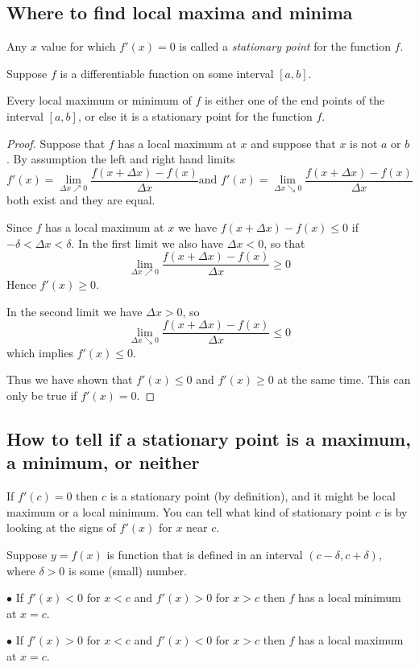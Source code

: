 \subsection{Where to find local maxima and minima}
\label{sec:where-find-maxes}
Any $x$ value for which $f'(x) = 0$ is called a \emph{stationary point} for the
function $f$.

\begin{theorem}\label{thm:zero-deriv-at-extrema}
  Suppose $f$ is a differentiable function on some interval $[a,b]$.

  Every local maximum or minimum of $f$ is either one of the end points of the
  interval $[a,b]$, or else it is a stationary point for the function $f$.
\end{theorem}

\begin{proof}
  Suppose that $f $ has a local maximum at $x$ and suppose that $x$ is not $a$
  or $b$.  By assumption the left and right hand limits
  \[
  f'(x) = \lim_{\Delta x\nearrow 0}\frac{f(x+\Delta x)-f(x)}{\Delta x} \text{
    and } f'(x) = \lim_{\Delta x\searrow 0}\frac{f(x+\Delta x)-f(x)}{\Delta x}
  \]
  both exist and they are equal.

  Since $f$ has a local maximum at $x$ we have $f(x+\Delta x)-f(x)\leq 0$ if
  $-\delta<\Delta x<\delta$.  In the first limit we also have $\Delta x<0$, so
  that
  \[
  \lim_{\Delta x\nearrow 0}\frac{f(x+\Delta x)-f(x)}{\Delta x} \geq 0
  \]
  Hence $f'(x) \geq 0$.

  In the second limit we have $\Delta x>0$, so
  \[
  \lim_{\Delta x\searrow 0}\frac{f(x+\Delta x)-f(x)}{\Delta x} \leq 0
  \]
  which implies $f'(x)\leq 0$.

  Thus we have shown that $f'(x)\leq0$ and $f'(x)\geq 0$ at the same time.  This
  can only be true if $f'(x) = 0$.
\end{proof}

\subsection{How to tell if a stationary point is a maximum, a minimum, or neither}
\label{sec:isitamaxormin}
If $f'(c)=0$ then $c$ is a stationary point (by definition), and it might be
local maximum or a local minimum.  You can tell what kind of stationary point
$c$ is by looking at the signs of $f'(x)$ for $x$ near $c$.

\begin{theorem}\label{thm:max-min-test}
  Suppose $y=f(x)$ is function that is defined in an interval
  $(c-\delta, c+\delta)$, where $\delta>0$ is some (small) number.
  \begin{trivlist}
  \item[$\bullet$] If $f'(x)<0$ for $x<c$ and $f'(x)>0$ for $x>c$ then $f$ has a
    local minimum at $x=c$.
  \item[$\bullet$] If $f'(x)>0$ for $x<c$ and $f'(x)<0$ for $x>c$ then $f$ has a
    local maximum at $x=c$.
  \end{trivlist}
\end{theorem}%
\marginpar{\sffamily\itshape\footnotesize%
   \\
   }
\smallskip

